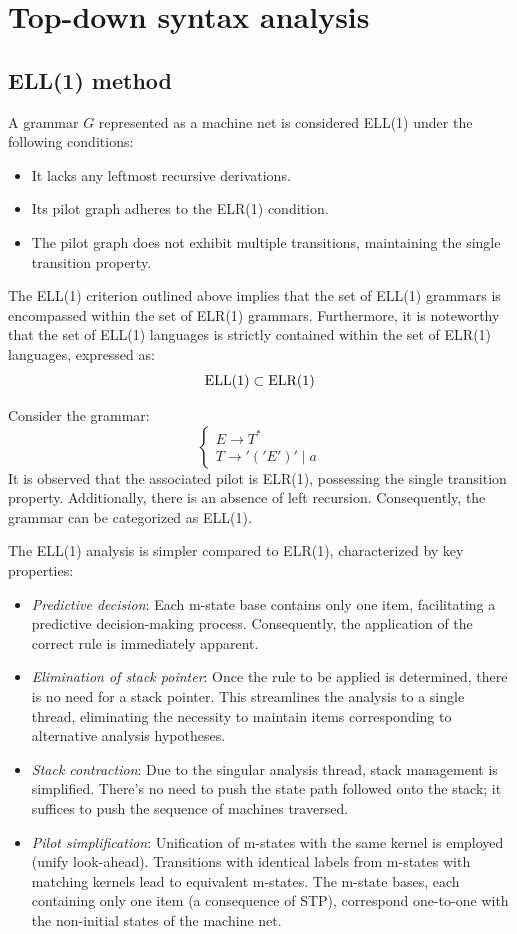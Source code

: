 \section{Top-down syntax analysis}

\subsection{ELL(1) method}
A grammar $G$ represented as a machine net is considered ELL(1) under the following conditions:
\begin{itemize}
    \item It lacks any leftmost recursive derivations.
    \item Its pilot graph adheres to the ELR(1) condition.
    \item The pilot graph does not exhibit multiple transitions, maintaining the single transition property.
\end{itemize}
The ELL(1) criterion outlined above implies that the set of ELL(1) grammars is encompassed within the set of ELR(1) grammars. 
Furthermore, it is noteworthy that the set of ELL(1) languages is strictly contained within the set of ELR(1) languages, expressed as:
\[\textnormal{ELL(1)} \subset \textnormal{ELR(1)}\]
\begin{example}
    Consider the grammar: 
    \[\begin{cases}
        E \rightarrow T^{\ast} \\
        T \rightarrow '('E')'\mid a
    \end{cases}\]
    It is observed that the associated pilot is ELR(1), possessing the single transition property.
    Additionally, there is an absence of left recursion. 
    Consequently, the grammar can be categorized as ELL(1).
\end{example}
The ELL(1) analysis is simpler compared to ELR(1), characterized by key properties:
\begin{itemize}
    \item \textit{Predictive decision}: Each m-state base contains only one item, facilitating a predictive decision-making process. 
        Consequently, the application of the correct rule is immediately apparent.
    \item \textit{Elimination of stack pointer}: Once the rule to be applied is determined, there is no need for a stack pointer. 
        This streamlines the analysis to a single thread, eliminating the necessity to maintain items corresponding to alternative analysis hypotheses.
    \item \textit{Stack contraction}: Due to the singular analysis thread, stack management is simplified. 
        There's no need to push the state path followed onto the stack; it suffices to push the sequence of machines traversed.
    \item \textit{Pilot simplification}: Unification of m-states with the same kernel is employed (unify look-ahead). 
        Transitions with identical labels from m-states with matching kernels lead to equivalent m-states. 
        The m-state bases, each containing only one item (a consequence of STP), correspond one-to-one with the non-initial states of the machine net.
\end{itemize}
